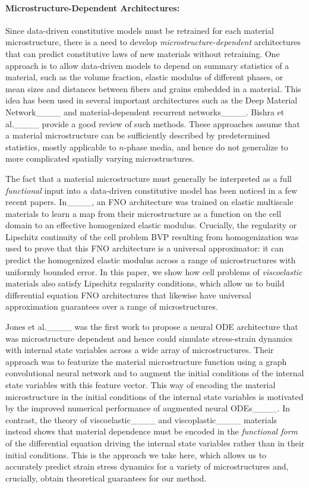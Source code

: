 \paragraph{Microstructure-Dependent Architectures:}
Since data-driven constitutive models must be retrained for each material microstructure, there is a need to develop \textit{microstructure-dependent} architectures that can predict constitutive laws of new materials without retraining. One approach is to allow data-driven models to depend on summary statistics of a material, such as the volume fraction, elastic modulus of different phases, or mean sizes and distances between fibers and grains embedded in a material. This idea has been used in several important architectures such as the Deep Material Network____ and material-dependent recurrent networks____. Bishra et al.____ provide a good review of such methods. These approaches assume that a material microstructure can be sufficiently described by predetermined statistics, mostly applicable to $n$-phase media, and hence do not generalize to more complicated spatially varying microstructures.

The fact that a material microstructure must generally be interpreted as a full \textit{functional} input into a data-driven constitutive model has been noticed in a few recent papers. In____, an FNO architecture was trained on elastic multiscale materials to learn a map from their microstructure as a function on the cell domain to an effective homogenized elastic modulus. Crucially, the regularity or Lipschitz continuity of the cell problem BVP resulting from homogenization was used to prove that this FNO architecture is a universal approximator: it can predict the homogenized elastic modulus across a range of microstructures with uniformly bounded error. In this paper, we show how cell problems of \textit{viscoelastic} materials also satisfy Lipschitz regularity conditions, which allow us to build differential equation FNO architectures that likewise have universal approximation guarantees over a range of microstructures.

Jones et al.____ was the first work to propose a neural ODE architecture that was microstructure dependent and hence could simulate stress-strain dynamics with internal state variables across a wide array of microstructures. Their approach was to featurize the material microstructure function using a graph convolutional neural network and to augment the initial conditions of the internal state variables with this feature vector. This way of encoding the material microstructure in the initial conditions of the internal state variables is motivated by the improved numerical performance of augmented neural ODEs____. In contrast, the theory of viscoelastic____ and viscoplastic____ materials instead shows that material dependence must be encoded in the \textit{functional form} of the differential equation driving the internal state variables rather than in their initial conditions. This is the approach we take here, which allows us to accurately predict strain stress dynamics for a variety of microstructures and, crucially, obtain theoretical guarantees for our method.
